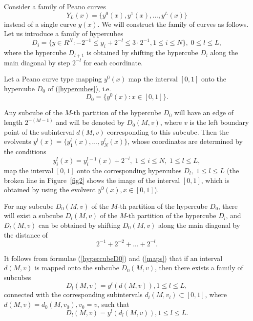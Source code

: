 \documentclass[entropy,article,submit,moreauthors,pdftex]{Definitions/mdpi}
\begin{document}
Consider a family of Peano curves
\begin{equation}\label{EvSet}
Y_L(x)=\{ y^0(x), y^1(x), ..., y^L(x) \}
\end{equation} 
instead of a single curve $y(x)$. We will construct the family of curves as follows. Let us introduce a family of hypercubes
\begin{equation}\label{hypercubes}
D_i = \{ y \in R^N: -2^{-1} \leq y_i + 2^{-l} \leq 3 \cdot 2^{-1},  1 \leq i \leq N \}, \; 0 \leq l \leq L,
\end{equation} 
where the hypercube $D_{l+1}$ is obtained by shifting the hypercube $D_l$ along the main diagonal by step $2^{-l}$ for each coordinate.

Let a Peano curve type mapping $y^0(x)$ map the interval $[0,1]$ onto the hypercube $D_0$ of (\ref{hypercubes}), i.e.
\begin{equation}\label{hypercubeD0}
D_0 = \{y^0(x): x \in [0, 1] \}.
\end{equation} 

Any subcube of the $M$-th partition of the hypercube $D_0$ will have an edge of length $2^{-(M-1)}$ and will be denoted by $D_0(M, v)$, where $v$ is the left boundary point of the subinterval $d(M, v)$ corresponding to this subcube. Then the evolvents $y^l(x)=\{y_1^l(x), ..., y_N^l(x)\}$, whose coordinates are determined by the conditions
\begin{equation}\label{maps}
y_i^l(x) = y_i^{l-1}(x) + 2^{-l}, \; 1 \leq i \leq N, \; 1 \leq l \leq L,
\end{equation} 
map the interval $[0,1]$ onto the corresponding hypercubes  $D_l, \; 1 \leq l \leq L$ (the broken line in Figure~\ref{fig2} shows the image of the interval $[0,1]$, which is obtained by using the evolvent $y^0(x), x \in [0,1]$).

For any subcube $D_0(M,v)$ of the $M$-th partition of the hypercube $D_0$, there will exist a subcube $D_l(M,v)$ of the $M$-th partition of the hypercube $D_l$, and $D_l(M,v)$ can be obtained by shifting $D_0(M,v)$ along the main diagonal by the distance of 
\[
2^{-1}+2^{-2}+...+2^{-l}.
\] 

It follows from formulae (\ref{hypercubeD0}) and (\ref{maps}) that if an interval $d(M,v)$ is mapped onto the subcube $D_0(M,v)$, then there exists a family of subcubes
\[
D_l(M,v) = y^l(d(M,v)), 1 \leq l \leq L,
\]
connected with the corresponding subintervals $d_l(M,v_l) \subset [0,1]$, where $d(M,v) = d_0(M,v_0), v_0 = v$, such that 
\[
D_l(M,v) = y^l(d_l(M,v)), 1 \leq l \leq L.
\] 
\end{document}
